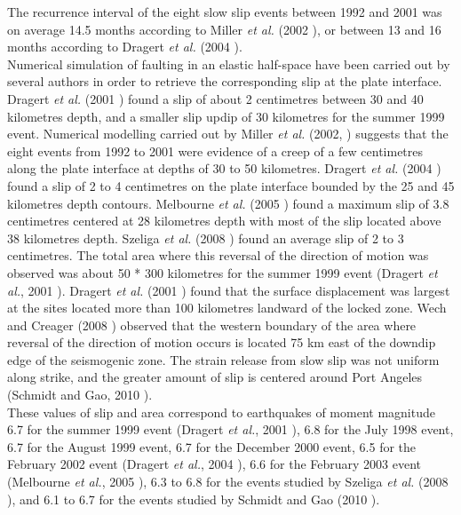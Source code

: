 \documentclass[main.tex]{subfiles}
\begin{document}
The recurrence interval of the eight slow slip events between 1992 and 2001 was on average 14.5 months according to Miller \textit{et al.} (2002 \cite{MIL_2002}), or between 13 and 16 months according to Dragert \textit{et al.} (2004 \cite{DRA_2004}). \\

Numerical simulation of faulting in an elastic half-space have been carried out by several authors in order to retrieve the corresponding slip at the plate interface. Dragert \textit{et al.} (2001 \cite{DRA_2001}) found a slip of about 2 centimetres between 30 and 40 kilometres depth, and a smaller slip updip of 30 kilometres for the summer 1999 event. Numerical modelling carried out by Miller \textit{et al.} (2002, \cite{MIL_2002}) suggests that the eight events from 1992 to 2001 were evidence of a  creep of a few centimetres along the plate interface at depths of 30 to 50 kilometres. Dragert \textit{et al.} (2004 \cite{DRA_2004}) found a slip of 2 to 4 centimetres on the plate interface bounded by the 25 and 45 kilometres depth contours. Melbourne \textit{et al.} (2005 \cite{MEL_2005}) found a maximum slip of 3.8 centimetres centered at 28 kilometres depth with most of the slip located above 38 kilometres depth. Szeliga \textit{et al.} (2008 \cite{SZE_2008}) found an average slip of 2 to 3 centimetres. The total area where this reversal of the direction of motion was observed was about 50 * 300 kilometres for the summer 1999 event (Dragert \textit{et al.}, 2001 \cite{DRA_2001}). Dragert \textit{et al.} (2001 \cite{DRA_2001}) found that the surface displacement was largest at the sites located more than 100 kilometres landward of the locked zone. Wech and Creager (2008 \cite{WEC_2008}) observed that the western boundary of the area where reversal of the direction of motion occurs is located 75 km east of the downdip edge of the seismogenic zone. The strain release from slow slip was not uniform along strike, and the greater amount of slip is centered around Port Angeles (Schmidt and Gao, 2010 \cite{SCH_2010}).\\

These values of slip and area correspond to earthquakes of moment magnitude 6.7 for the summer 1999 event (Dragert \textit{et al.}, 2001 \cite{DRA_2001}), 6.8 for the July 1998 event, 6.7 for the August 1999 event, 6.7 for the December 2000 event, 6.5 for the February 2002 event (Dragert \textit{et al.}, 2004 \cite{DRA_2004}), 6.6 for the February 2003 event (Melbourne \textit{et al.}, 2005 \cite{MEL_2005}), 6.3 to 6.8 for the events studied by Szeliga \textit{et al.} (2008 \cite{SZE_2008}), and 6.1 to 6.7 for the events studied by Schmidt and Gao (2010 \cite{SCH_2010}). \\
\end{document}
